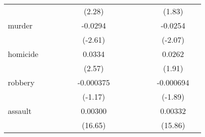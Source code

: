 {\begin{tabular}{l*{12}{c}}
            &                     &                     &                     &                     &      (2.28)         &                     &                     &                     &                     &                     &      (1.83)         &                     \\
[1em]
murder      &                     &                     &                     &                     &     -0.0294\sym{*}  &                     &                     &                     &                     &                     &     -0.0254\sym{*}  &                     \\
            &                     &                     &                     &                     &     (-2.61)         &                     &                     &                     &                     &                     &     (-2.07)         &                     \\
[1em]
homicide    &                     &                     &                     &                     &      0.0334\sym{*}  &                     &                     &                     &                     &                     &      0.0262         &                     \\
            &                     &                     &                     &                     &      (2.57)         &                     &                     &                     &                     &                     &      (1.91)         &                     \\
[1em]
robbery     &                     &                     &                     &                     &   -0.000375         &                     &                     &                     &                     &                     &   -0.000694         &                     \\
            &                     &                     &                     &                     &     (-1.17)         &                     &                     &                     &                     &                     &     (-1.89)         &                     \\
[1em]
assault     &                     &                     &                     &                     &     0.00300\sym{***}&                     &                     &                     &                     &                     &     0.00332\sym{***}&                     \\
            &                     &                     &                     &                     &     (16.65)         &                     &                     &                     &                     &                     &     (15.86)         &                     \\

\end{tabular}}
